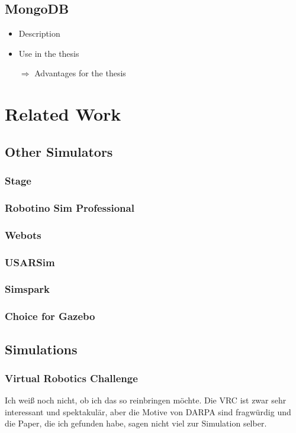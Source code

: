 \documentclass[a4paper,11pt]{article}
\begin{document}
\subsection{MongoDB}
\begin{itemize}
\item Description
\item Use in the thesis
\item[$\Rightarrow$] Advantages for the thesis
\end{itemize}

\section{Related Work}
\subsection{Other Simulators}
\subsubsection{Stage}
\subsubsection{Robotino Sim Professional}
\subsubsection{Webots}
\subsubsection{USARSim}
\subsubsection{Simspark}
\subsubsection{Choice for Gazebo}
\subsection{Simulations}
\subsubsection{Virtual Robotics Challenge}
Ich weiß noch nicht, ob ich das so reinbringen möchte. Die VRC ist zwar sehr interessant und spektakulär, aber die Motive von DARPA sind fragwürdig und die Paper, die ich gefunden habe, sagen nicht viel zur Simulation selber.
\end{document}
